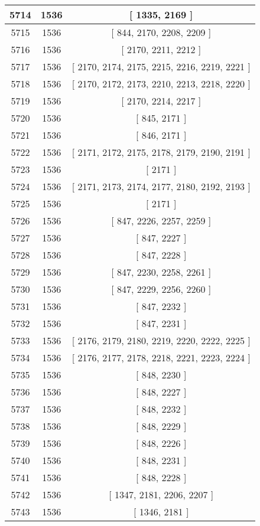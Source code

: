 \begin{center}
\begin{longtable}[H]{|| c c c ||}
\hline
5714 & 1536 & [ 1335, 2169 ] \\ 
\hline
5715 & 1536 & [ 844, 2170, 2208, 2209 ] \\ 
\hline
5716 & 1536 & [ 2170, 2211, 2212 ] \\ 
\hline
5717 & 1536 & [ 2170, 2174, 2175, 2215, 2216, 2219, 2221 ] \\ 
\hline
5718 & 1536 & [ 2170, 2172, 2173, 2210, 2213, 2218, 2220 ] \\ 
\hline
5719 & 1536 & [ 2170, 2214, 2217 ] \\ 
\hline
5720 & 1536 & [ 845, 2171 ] \\ 
\hline
5721 & 1536 & [ 846, 2171 ] \\ 
\hline
5722 & 1536 & [ 2171, 2172, 2175, 2178, 2179, 2190, 2191 ] \\ 
\hline
5723 & 1536 & [ 2171 ] \\ 
\hline
5724 & 1536 & [ 2171, 2173, 2174, 2177, 2180, 2192, 2193 ] \\ 
\hline
5725 & 1536 & [ 2171 ] \\ 
\hline
5726 & 1536 & [ 847, 2226, 2257, 2259 ] \\ 
\hline
5727 & 1536 & [ 847, 2227 ] \\ 
\hline
5728 & 1536 & [ 847, 2228 ] \\ 
\hline
5729 & 1536 & [ 847, 2230, 2258, 2261 ] \\ 
\hline
5730 & 1536 & [ 847, 2229, 2256, 2260 ] \\ 
\hline
5731 & 1536 & [ 847, 2232 ] \\ 
\hline
5732 & 1536 & [ 847, 2231 ] \\ 
\hline
5733 & 1536 & [ 2176, 2179, 2180, 2219, 2220, 2222, 2225 ] \\ 
\hline
5734 & 1536 & [ 2176, 2177, 2178, 2218, 2221, 2223, 2224 ] \\ 
\hline
5735 & 1536 & [ 848, 2230 ] \\ 
\hline
5736 & 1536 & [ 848, 2227 ] \\ 
\hline
5737 & 1536 & [ 848, 2232 ] \\ 
\hline
5738 & 1536 & [ 848, 2229 ] \\ 
\hline
5739 & 1536 & [ 848, 2226 ] \\ 
\hline
5740 & 1536 & [ 848, 2231 ] \\ 
\hline
5741 & 1536 & [ 848, 2228 ] \\ 
\hline
5742 & 1536 & [ 1347, 2181, 2206, 2207 ] \\ 
\hline
5743 & 1536 & [ 1346, 2181 ] \\ 

\end{longtable}
\end{center}
